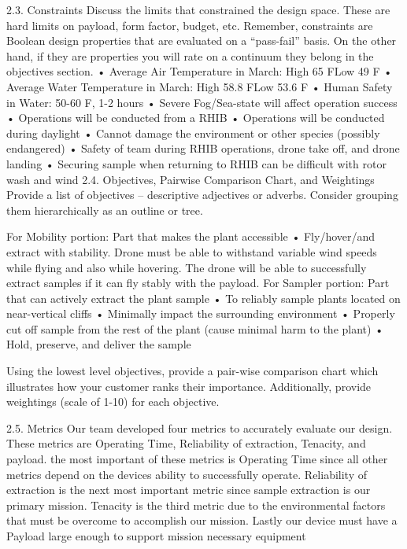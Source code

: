         2.3. Constraints
Discuss the limits that constrained the design space. These are hard limits on payload, form factor, budget, etc.  Remember, constraints are Boolean design properties that are evaluated on a “pass-fail” basis.  On the other hand, if they are properties you will rate on a continuum they belong in the objectives section.
    • Average Air Temperature in March: High 65 FLow 49 F
    • Average Water Temperature in March: High 58.8 FLow 53.6 F
    • Human Safety in Water: 50-60 F, 1-2 hours
    • Severe Fog/Sea-state will affect operation success
    • Operations will be conducted from a RHIB
    • Operations will be conducted during daylight
    • Cannot damage the environment or other species (possibly endangered)
    • Safety of team during RHIB operations, drone take off, and drone landing
    • Securing sample when returning to RHIB can be difficult with rotor wash and wind
        2.4. Objectives, Pairwise Comparison Chart, and Weightings 
Provide a list of objectives – descriptive adjectives or adverbs.   Consider grouping them hierarchically as an outline or tree.   

For Mobility portion: Part that makes the plant accessible
    • Fly/hover/and extract with stability. Drone must be able to withstand variable  wind speeds while flying and also while hovering. The drone will be able to successfully extract samples if it can fly stably with the payload. 
	For Sampler portion: Part that can actively extract the plant sample
    • To reliably sample plants located on near-vertical cliffs
    • Minimally impact the surrounding environment
    • Properly cut off sample from the rest of the plant (cause minimal harm to the plant)
    • Hold, preserve, and deliver the sample

Using the lowest level objectives, provide a pair-wise comparison chart which illustrates how your customer ranks their importance.   Additionally, provide weightings (scale of 1-10) for each objective.

        2.5. Metrics 
Our team developed four metrics  to accurately evaluate our design. These metrics are Operating Time, Reliability of extraction, Tenacity, and payload. the most important of these metrics is Operating Time since all other metrics depend on the devices ability to successfully operate. Reliability of extraction is the next most important metric since sample extraction is our primary mission.  Tenacity is the third metric due to the environmental factors that must be overcome to accomplish our mission. Lastly our device must have a Payload large enough to support mission necessary equipment

